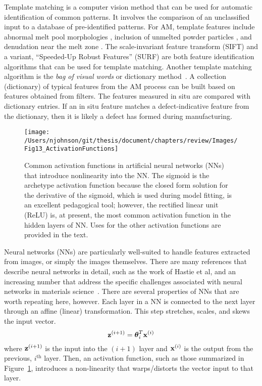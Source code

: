 Template matching is a computer vision method that can be used for automatic identification of common patterns. It involves the comparison of an unclassified input to a database of pre-identified patterns. For AM, template features include abnormal melt pool morphologies \cite{Kanko2016}, inclusion of unmelted powder particles \cite{Yang2017}, and denudation near the melt zone \cite{Matthews2016}. The scale-invariant feature transform (SIFT) \cite{Lowe2004} and a variant, ``Speeded-Up Robust Features'' (SURF) \cite{Bay2008} are both feature identification algorithms that can be used for template matching. Another template matching algorithm is the \textit{bag of visual words} or dictionary method~\cite{DeCost2015}. A collection (dictionary) of typical features from the AM process can be built based on features obtained from filters. The features measured in situ are compared with dictionary entries. If an in situ feature matches a defect-indicative feature from the dictionary, then it is likely a defect has formed during manufacturing.

\begin{figure}
	\texttt{[image: /Users/njohnson/git/thesis/document/chapters/review/Images/Fig13\_ActivationFunctions]}
	\caption{Common activation functions in artificial neural networks (NNs) that introduce nonlinearity into the NN. The sigmoid is the archetype activation function because the closed form solution for the derivative of the sigmoid, which is used during model fitting, is an excellent pedagogical tool; however, the rectified linear unit (ReLU) is, at present, the most common activation function in the hidden layers of NN. Uses for the other activation functions are provided in the text.}
	\label{fig:activation functions}
\end{figure}

Neural networks (NNs) are particularly well-suited to handle features extracted from images, or simply the images themselves. There are many references that describe neural networks in detail, such as the work of Hastie et al\cite{Hastie2009}, and an increasing number that address the specific challenges associated with neural networks in materials science~\cite{Bhadeshia2009}. There are several properties of NNs that are worth repeating here, however. Each layer in a NN is connected to the next layer through an affine (linear) transformation. This step stretches, scales, and skews the input vector.
\begin{equation}
	{\bold z}^{(i+1)} = \boldsymbol \theta_i^T {\bold x}^{(i)}
\end{equation}
where ${\bold z}^{(i+1)}$ is the input into the $(i+1)$ layer and ${\bold x}^{(i)}$ is the output from the previous, $i^\textrm{th}$ layer. Then, an activation function, such as those summarized in Figure~\ref{fig:activation functions}, introduces a non-linearity that warps/distorts the vector input to that layer.

